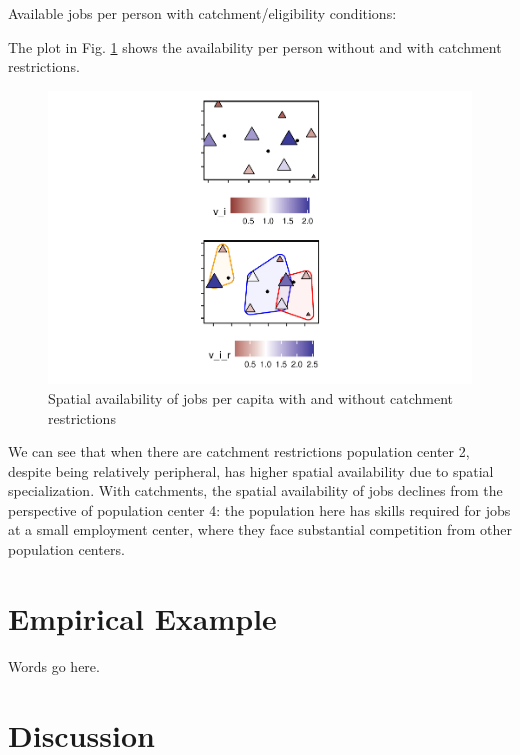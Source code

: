 \documentclass[]{elsarticle} %
\begin{document}
Available jobs per person with catchment/eligibility conditions:

The plot in Fig.
\ref{fig:toy-example-availability-with-catchments-per-capita} shows the
availability per person without and with catchment restrictions.

\begin{figure}
\includegraphics[width=1\linewidth]{Spatial-Availability_files/figure-latex/toy-example-availability-with-catchments-per-capita-1} \caption{\label{fig:toy-example-availability-with-catchments-per-capita}Spatial availability of jobs per capita with and without catchment restrictions }\label{fig:toy-example-availability-with-catchments-per-capita}
\end{figure}

We can see that when there are catchment restrictions population center
2, despite being relatively peripheral, has higher spatial availability
due to spatial specialization. With catchments, the spatial availability
of jobs declines from the perspective of population center 4: the
population here has skills required for jobs at a small employment
center, where they face substantial competition from other population
centers.

\hypertarget{empirical-example}{%
\section{Empirical Example}\label{empirical-example}}

Words go here.

\hypertarget{discussion}{%
\section{Discussion}\label{discussion}}
\end{document}
